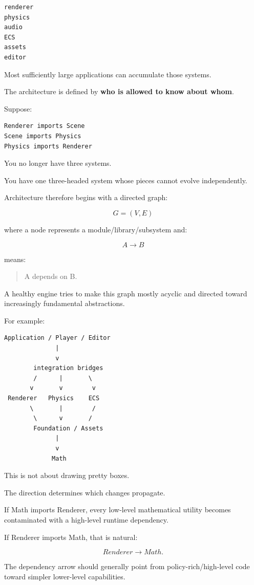 \begin{verbatim}
renderer
physics
audio
ECS
assets
editor
\end{verbatim}

Most sufficiently large applications can accumulate those systems.

The architecture is defined by \textbf{who is allowed to know about whom}.

Suppose:

\begin{verbatim}
Renderer imports Scene
Scene imports Physics
Physics imports Renderer
\end{verbatim}

You no longer have three systems.

You have one three-headed system whose pieces cannot evolve independently.

Architecture therefore begins with a directed graph:

\[
G=(V,E)
\]

where a node represents a module/library/subsystem and:

\[
A\rightarrow B
\]

means:

\begin{quote}
A depends on B.
\end{quote}

A healthy engine tries to make this graph mostly acyclic and directed toward increasingly fundamental abstractions.

For example:

\begin{verbatim}
Application / Player / Editor
              |
              v
        integration bridges
        /      |       \
       v       v        v
 Renderer   Physics    ECS
       \       |        /
        \      v       /
        Foundation / Assets
              |
              v
             Math
\end{verbatim}

This is not about drawing pretty boxes.

The direction determines which changes propagate.

If Math imports Renderer, every low-level mathematical utility becomes contaminated with a high-level runtime dependency.

If Renderer imports Math, that is natural:

\[
Renderer\rightarrow Math.
\]

The dependency arrow should generally point from policy-rich/high-level code toward simpler lower-level capabilities.

